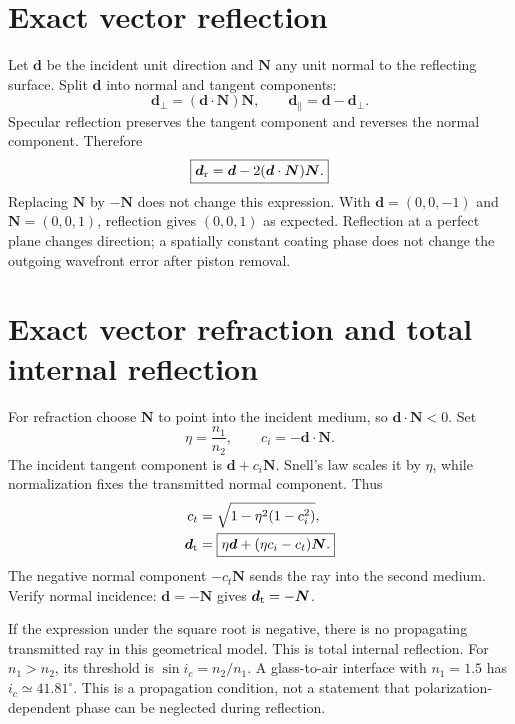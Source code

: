 \section{Exact vector reflection}
Let $\bm{d}$ be the incident unit direction and $\bm{N}$ any unit normal to the reflecting surface. Split $\bm{d}$ into normal and tangent components:
\[
\bm{d}_\perp=(\bm{d}\cdot\bm{N})\bm{N},\qquad
\bm{d}_\parallel=\bm{d}-\bm{d}_\perp.
\]
Specular reflection preserves the tangent component and reverses the normal component. Therefore
\begin{equation}
\boxed{\bm{d}_{\rm r}=\bm{d}-2(\bm{d}\cdot\bm{N})\bm{N}.}
\label{fnd:reflection}
\end{equation}
Replacing $\bm{N}$ by $-\bm{N}$ does not change this expression. With $\bm{d}=(0,0,-1)$ and $\bm{N}=(0,0,1)$, reflection gives $(0,0,1)$ as expected. Reflection at a perfect plane changes direction; a spatially constant coating phase does not change the outgoing wavefront error after piston removal.

\section{Exact vector refraction and total internal reflection}
For refraction choose $\bm{N}$ to point into the incident medium, so $\bm{d}\cdot\bm{N}<0$. Set
\[
\eta=\frac{n_1}{n_2},\qquad c_i=-\bm{d}\cdot\bm{N}.
\]
The incident tangent component is $\bm{d}+c_i\bm{N}$. Snell's law scales it by $\eta$, while normalization fixes the transmitted normal component. Thus
\begin{align}
c_t&=\sqrt{1-\eta^2(1-c_i^2)},\\
\bm{d}_{\rm t}&=\boxed{\eta\bm{d}+(\eta c_i-c_t)\bm{N}.}
\label{fnd:vector-snell}
\end{align}
The negative normal component $-c_t\bm{N}$ sends the ray into the second medium. Verify normal incidence: $\bm{d}=-\bm{N}$ gives $\bm{d}_{\rm t}=-\bm{N}$.

If the expression under the square root is negative, there is no propagating transmitted ray in this geometrical model. This is total internal reflection. For $n_1>n_2$, its threshold is $\sin i_c=n_2/n_1$. A glass-to-air interface with $n_1=1.5$ has $i_c\simeq41.81^\circ$. This is a propagation condition, not a statement that polarization-dependent phase can be neglected during reflection.

